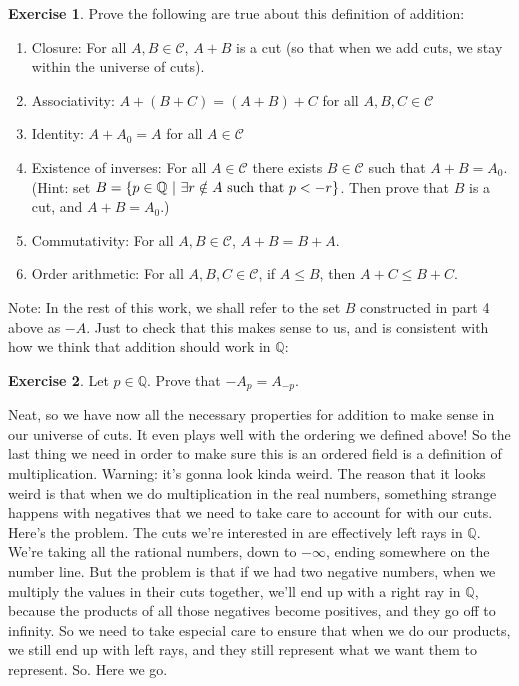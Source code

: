 \documentclass{article}
\theoremstyle{definition}
\newtheorem{exercise}{Exercise}
\newcommand{\Q}{\mathbb{Q}}
\begin{document}
\begin{exercise}
Prove the following are true about this definition of addition:
\begin{enumerate}
\item Closure: For all $A, B\in \mathcal{C}$, $A+B$ is a cut (so that when we add cuts, we stay within the universe of cuts).
\item Associativity: $A+(B+C)=(A+B)+C$ for all $A, B, C\in \mathcal{C}$
\item Identity: $A+A_0=A$ for all $A\in \mathcal{C}$
\item Existence of inverses: For all $A\in \mathcal{C}$ there exists $B\in \mathcal{C}$ such that $A+B=A_0$. (Hint: set $B=\{p\in \Q\ | \ \exists r\notin A\hbox{ such that }p<-r\}$. Then prove that $B$ is a cut, and $A+B=A_0$.)
\item Commutativity: For all $A, B\in \mathcal{C}$, $A+B=B+A$.
\item Order arithmetic: For all $A, B, C\in \mathcal{C}$, if $A\leq B$, then $A+C\leq B+C$.
\end{enumerate}
\end{exercise}

Note: In the rest of this work, we shall refer to the set $B$ constructed in part 4 above as $-A$. Just to check that this makes sense to us, and is consistent with how we think that addition should work in $\Q$:

\begin{exercise}
Let $p\in \Q$. Prove that $-A_p=A_{-p}$.
\end{exercise}

Neat, so we have now all the necessary properties for addition to make sense in our universe of cuts. It even plays well with the ordering we defined above! So the last thing we need in order to make sure this is an ordered field is a definition of multiplication. Warning: it's gonna look kinda weird. The reason that it looks weird is that when we do multiplication in the real numbers, something strange happens with negatives that we need to take care to account for with our cuts. Here's the problem. The cuts we're interested in are effectively left rays in $\Q$. We're taking all the rational numbers, down to $-\infty$, ending somewhere on the number line. But the problem is that if we had two negative numbers, when we multiply the values in their cuts together, we'll end up with a right ray in $\Q$, because the products of all those negatives become positives, and they go off to infinity. So we need to take especial care to ensure that when we do our products, we still end up with left rays, and they still represent what we want them to represent. So. Here we go.
\end{document}
